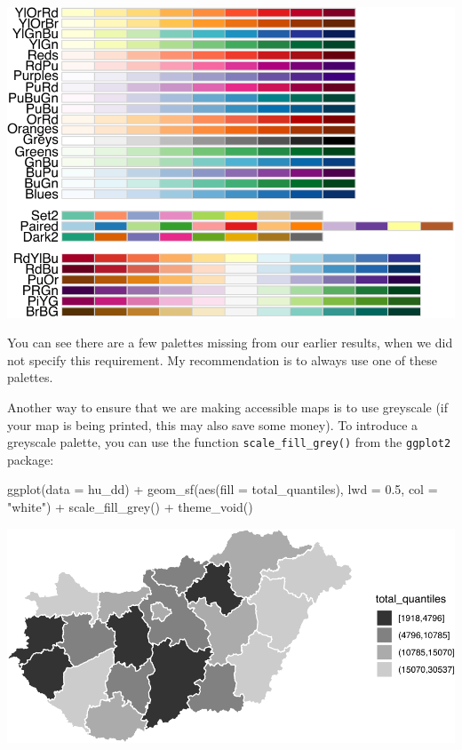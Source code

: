 \documentclass[
  krantz2]{krantz}
\makeatletter
\newenvironment{Shaded}{\begin{snugshade}}{\end{snugshade}}
\newcommand{\AttributeTok}[1]{\textcolor[rgb]{0.61,0.61,0.61}{#1}}
\newcommand{\FloatTok}[1]{\textcolor[rgb]{0.06,0.06,0.06}{#1}}
\newcommand{\FunctionTok}[1]{\textcolor[rgb]{0,0,0}{#1}}
\newcommand{\NormalTok}[1]{#1}
\newcommand{\SpecialCharTok}[1]{\textcolor[rgb]{0,0,0}{#1}}
\newcommand{\StringTok}[1]{\textcolor[rgb]{0.5,0.5,0.5}{#1}}
\newenvironment{kframe}{%
\medskip{}
\setlength{\fboxsep}{.8em}
 \def\at@end@of@kframe{}%
 \ifinner\ifhmode%
  \def\at@end@of@kframe{\end{minipage}}%
  \begin{minipage}{\columnwidth}%
 \fi\fi%
 \def\FrameCommand##1{\hskip\@totalleftmargin \hskip-\fboxsep
 \colorbox{shadecolor}{##1}\hskip-\fboxsep
     \hskip-\linewidth \hskip-\@totalleftmargin \hskip\columnwidth}%
 \MakeFramed {\advance\hsize-\width
   \@totalleftmargin\z@ \linewidth\hsize
   \@setminipage}}%
 {\par\unskip\endMakeFramed%
 \at@end@of@kframe}
\renewenvironment{Shaded}{\begin{kframe}}{\end{kframe}}
\makeatother
\begin{document}
\includegraphics{crime_mapping_files/figure-latex/unnamed-chunk-158-1.pdf}

You can see there are a few palettes missing from our earlier results, when we did not specify this requirement. My recommendation is to always use one of these palettes.

Another way to ensure that we are making accessible maps is to use greyscale (if your map is being printed, this may also save some money). To introduce a greyscale palette, you can use the function \texttt{scale\_fill\_grey()} from the \texttt{ggplot2} package:

\begin{Shaded}
\begin{Highlighting}[]
\FunctionTok{ggplot}\NormalTok{(}\AttributeTok{data =}\NormalTok{ hu\_dd) }\SpecialCharTok{+} 
  \FunctionTok{geom\_sf}\NormalTok{(}\FunctionTok{aes}\NormalTok{(}\AttributeTok{fill =}\NormalTok{ total\_quantiles), }\AttributeTok{lwd =} \FloatTok{0.5}\NormalTok{, }\AttributeTok{col =} \StringTok{"white"}\NormalTok{) }\SpecialCharTok{+} 
  \FunctionTok{scale\_fill\_grey}\NormalTok{() }\SpecialCharTok{+} 
  \FunctionTok{theme\_void}\NormalTok{()}
\end{Highlighting}
\end{Shaded}

\includegraphics{crime_mapping_files/figure-latex/greyscaletestsmap-1.pdf}
\end{document}

